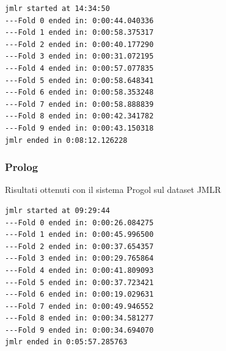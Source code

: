 \begin{verbatim}
jmlr started at 14:34:50
---Fold 0 ended in: 0:00:44.040336
---Fold 1 ended in: 0:00:58.375317
---Fold 2 ended in: 0:00:40.177290
---Fold 3 ended in: 0:00:31.072195
---Fold 4 ended in: 0:00:57.077835
---Fold 5 ended in: 0:00:58.648341
---Fold 6 ended in: 0:00:58.353248
---Fold 7 ended in: 0:00:58.888839
---Fold 8 ended in: 0:00:42.341782
---Fold 9 ended in: 0:00:43.150318
jmlr ended in 0:08:12.126228
\end{verbatim}


\subsubsection{Prolog}
\begin{table}[H]
\caption[Risultati Progol-JMLR]{Risultati ottenuti con il sistema Progol sul dataset JMLR}
\label{tab:ris:progol:jmlr}
\end{table}

\begin{verbatim}
jmlr started at 09:29:44
---Fold 0 ended in: 0:00:26.084275
---Fold 1 ended in: 0:00:45.996500
---Fold 2 ended in: 0:00:37.654357
---Fold 3 ended in: 0:00:29.765864
---Fold 4 ended in: 0:00:41.809093
---Fold 5 ended in: 0:00:37.723421
---Fold 6 ended in: 0:00:19.029631
---Fold 7 ended in: 0:00:49.946552
---Fold 8 ended in: 0:00:34.581277
---Fold 9 ended in: 0:00:34.694070
jmlr ended in 0:05:57.285763
\end{verbatim}

